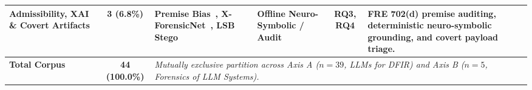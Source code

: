 \begin{table}[!t]
\begin{tabular}{p{2.2cm}cp{3.7cm}p{2.1cm}cp{3.9cm}}
\addlinespace
Admissibility, XAI \& Covert Artifacts & 3 (6.8\%) & Premise Bias~\cite{trivedi2026_when}, X-ForensicNet~\cite{tiwari2026_xforensicnet}, LSB Stego~\cite{sudheer2026_least} & Offline Neuro-Symbolic / Audit & RQ3, RQ4 & FRE 702(d) premise auditing, deterministic neuro-symbolic grounding, and covert payload triage. \\
\midrule
\textbf{Total Corpus} & \textbf{44 (100.0\%)} & \multicolumn{4}{p{10.8cm}}{\textit{Mutually exclusive partition across Axis A ($n=39$, LLMs for DFIR) and Axis B ($n=5$, Forensics of LLM Systems).}} \\
\bottomrule
\end{tabular}
\end{table}
